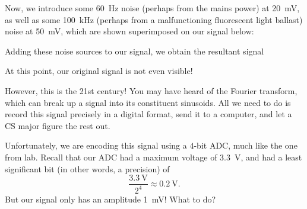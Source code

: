 \documentclass[letterpaper]{article}
\theoremstyle{remark}
\begin{document}
Now, we introduce some \SI{60}{\hertz} noise (perhaps from the mains power) at \SI{20}{\milli\volt}, as well as some \SI{100}{\kilo\hertz} (perhaps from a malfunctioning fluorescent light ballast) noise at \SI{50}{\milli\volt}, which are shown superimposed on our signal below:
\begin{center}
\end{center}
Adding these noise sources to our signal, we obtain the resultant signal
\begin{center}
\end{center}
At this point, our original signal is not even visible!

However, this is the 21st century! You may have heard of the Fourier transform, which can break up a signal into its constituent sinusoids. All we need to do is record this signal precisely in a digital format, send it to a computer, and let a CS major figure the rest out.

Unfortunately, we are encoding this signal using a $4$-bit ADC, much like the one from lab. Recall that our ADC had a maximum voltage of \SI{3.3}{\volt}, and had a least significant bit (in other words, a precision) of
\[
    \frac{\SI{3.3}{\volt}}{2^4} \approx \SI{0.2}{\volt}.
\]
But our signal only has an amplitude \SI{1}{\milli\volt}! What to do?
\end{document}
